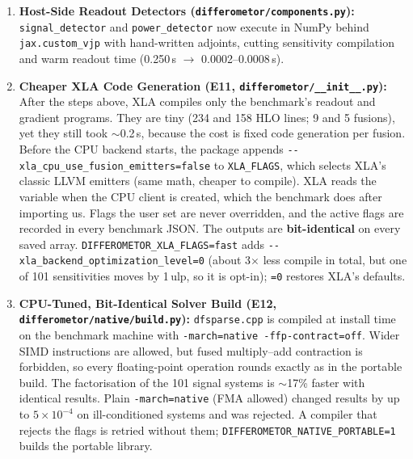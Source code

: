 \documentclass[11pt,a4paper]{article}
\begin{document}
\begin{enumerate}[leftmargin=1.6em,itemsep=3pt]
\begin{itemize}[leftmargin=1.2em,itemsep=1pt]
        \item \emph{Refinement \& fallback:} Every \texttt{N}/\texttt{T}/\texttt{H} solve applies 1 step of fixed-precision sparse iterative refinement (matching \texttt{RefinedLU} on ill-conditioned setups where $\kappa \sim 10^{31}$), singular blocks emit local \texttt{NaN}s, and \texttt{DIFFEROMETOR\_NATIVE=0} falls back to block-diagonal \texttt{\_superlu}.
    \end{itemize}
    \item \textbf{Host-Side Readout Detectors (\texttt{differometor/components.py}):} \texttt{signal\_detector} and \texttt{power\_detector} now execute in NumPy behind \texttt{jax.custom\_vjp} with hand-written adjoints, cutting sensitivity compilation and warm readout time (0.250\,s $\to$ 0.0002--0.0008\,s).
    \item \textbf{Cheaper XLA Code Generation (E11, \texttt{differometor/\_\_init\_\_.py}):} After the steps above, XLA compiles only the benchmark's readout and gradient programs. They are tiny (234 and 158 HLO lines; 9 and 5 fusions), yet they still took $\sim$0.2\,s, because the cost is fixed code generation per fusion. Before the CPU backend starts, the package appends \texttt{-{}-xla\_cpu\_use\_fusion\_emitters=false} to \texttt{XLA\_FLAGS}, which selects XLA's classic LLVM emitters (same math, cheaper to compile). XLA reads the variable when the CPU client is created, which the benchmark does after importing us. Flags the user set are never overridden, and the active flags are recorded in every benchmark JSON. The outputs are \textbf{bit-identical} on every saved array. \texttt{DIFFEROMETOR\_XLA\_FLAGS=fast} adds \texttt{-{}-xla\_backend\_optimization\_level=0} (about 3$\times$ less compile in total, but one of 101 sensitivities moves by 1\,ulp, so it is opt-in); \texttt{=0} restores XLA's defaults.
    \item \textbf{CPU-Tuned, Bit-Identical Solver Build (E12, \texttt{differometor/native/build.py}):} \texttt{dfsparse.cpp} is compiled at install time on the benchmark machine with \texttt{-march=native -ffp-contract=off}. Wider SIMD instructions are allowed, but fused multiply--add contraction is forbidden, so every floating-point operation rounds exactly as in the portable build. The factorisation of the 101 signal systems is $\sim$17\% faster with identical results. Plain \texttt{-march=native} (FMA allowed) changed results by up to $5\times 10^{-4}$ on ill-conditioned systems and was rejected. A compiler that rejects the flags is retried without them; \texttt{DIFFEROMETOR\_NATIVE\_PORTABLE=1} builds the portable library.

\end{enumerate}
\end{document}
